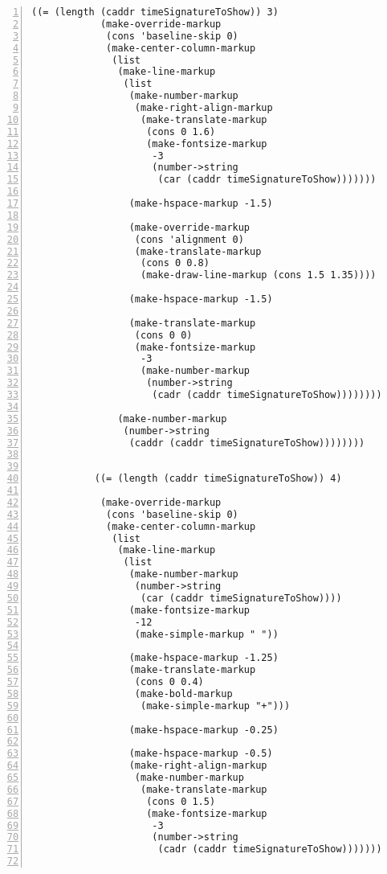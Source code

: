 \begin{Verbatim}[numbers=left,xleftmargin=5mm]
           ((= (length (caddr timeSignatureToShow)) 3)
            (make-override-markup
             (cons 'baseline-skip 0)
             (make-center-column-markup
              (list
               (make-line-markup
                (list
                 (make-number-markup
                  (make-right-align-markup
                   (make-translate-markup
                    (cons 0 1.6)
                    (make-fontsize-markup
                     -3
                     (number->string
                      (car (caddr timeSignatureToShow)))))))

                 (make-hspace-markup -1.5)

                 (make-override-markup
                  (cons 'alignment 0)
                  (make-translate-markup
                   (cons 0 0.8)
                   (make-draw-line-markup (cons 1.5 1.35))))

                 (make-hspace-markup -1.5)

                 (make-translate-markup
                  (cons 0 0)
                  (make-fontsize-markup
                   -3
                   (make-number-markup
                    (number->string
                     (cadr (caddr timeSignatureToShow))))))))

               (make-number-markup
                (number->string
                 (caddr (caddr timeSignatureToShow))))))))


           ((= (length (caddr timeSignatureToShow)) 4)

            (make-override-markup
             (cons 'baseline-skip 0)
             (make-center-column-markup
              (list
               (make-line-markup
                (list
                 (make-number-markup
                  (number->string
                   (car (caddr timeSignatureToShow))))
                 (make-fontsize-markup
                  -12
                  (make-simple-markup " "))

                 (make-hspace-markup -1.25)
                 (make-translate-markup
                  (cons 0 0.4)
                  (make-bold-markup
                   (make-simple-markup "+")))

                 (make-hspace-markup -0.25)

                 (make-hspace-markup -0.5)
                 (make-right-align-markup
                  (make-number-markup
                   (make-translate-markup
                    (cons 0 1.5)
                    (make-fontsize-markup
                     -3
                     (number->string
                      (cadr (caddr timeSignatureToShow)))))))


\end{Verbatim}
